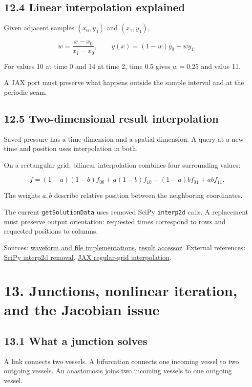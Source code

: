 \documentclass[11pt,a4paper]{article}
\begin{document}
\subsection{12.4 Linear interpolation explained}
Given adjacent samples \((x_0,y_0)\) and \((x_1,y_1)\),


\begingroup\small
\[
w=\frac{x-x_0}{x_1-x_0},
\qquad
y(x)=(1-w)y_0+wy_1.
\]
\endgroup


For values 10 at time 0 and 14 at time 2, time 0.5 gives \(w=0.25\) and value 11.

A JAX port must preserve what happens outside the sample interval and at the periodic seam.

\subsection{12.5 Two-dimensional result interpolation}
Saved pressure has a time dimension and a spatial dimension. A query at a new time and position uses interpolation in both.

On a rectangular grid, bilinear interpolation combines four surrounding values:


\begingroup\small
\[
f=(1-a)(1-b)f_{00}
+a(1-b)f_{10}
+(1-a)bf_{01}+abf_{11}.
\]
\endgroup


The weights \(a,b\) describe relative position between the neighboring coordinates.

The current \texttt{getSolutionData} uses removed SciPy \texttt{interp2d} calls. A replacement must preserve output orientation: requested times correspond to rows and requested positions to columns.

Sources: \href{/home/sadid/starfish/NetworkLib/classBoundaryConditions.py}{waveform and file implementations}, \href{/home/sadid/starfish/NetworkLib/classVascularNetwork.py}{result accessor}. External references: \href{https://docs.scipy.org/doc/scipy/reference/generated/scipy.interpolate.interp2d.html}{SciPy interp2d removal}, \href{https://docs.jax.dev/en/latest/_autosummary/jax.scipy.interpolate.RegularGridInterpolator.html}{JAX regular-grid interpolation}.

\clearpage
\section{13. Junctions, nonlinear iteration, and the Jacobian issue}
\subsection{13.1 What a junction solves}
A link connects two vessels. A bifurcation connects one incoming vessel to two outgoing vessels. An anastomosis joins two incoming vessels to one outgoing vessel.
\end{document}
